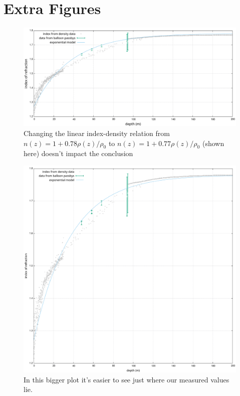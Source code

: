 \chapter{Extra Figures}
\label{app:ExtraFigures}
\begin{figure}[h]
	\centering
	\includegraphics[width=\textwidth]{figures/ResultsOtherLinear.pdf}
  \caption{Changing the linear index-density relation from $n(z) = 1+0.78\rho(z)/\rho_0$ to $n(z) = 1+0.77\rho(z)/\rho_0$ (shown here) doesn't impact
  the conclusion}
	\label{fig:ResultsOtherLinear}
\end{figure}
\begin{figure}
	\centering
	\includegraphics[width=\textwidth]{figures/ResultsBig.pdf}
  \caption{In this bigger plot it's easier to see just where our measured values lie.}
	\label{fig:ResultsBig}
\end{figure}
